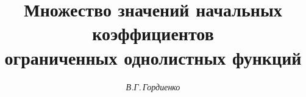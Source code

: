 













\newcommand{\im}{\operatorname{Im}}


\newcommand{\re}{\operatorname{Re}}


\newcommand{\tg}{\operatorname{tg}}


\renewcommand{\baselinestretch}{0.96}


\newcommand{\tts}[1]{}










\setcounter{page}{14}












\author{\it В.Г.\,Гордиенко}




\title{Множество значений начальных коэффициентов\\


ограниченных однолистных функций}









